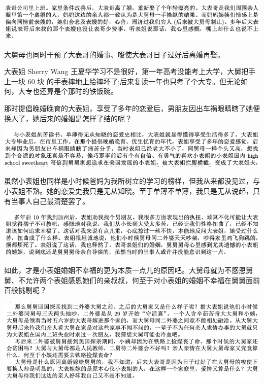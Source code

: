 \documentclass[9pt, b5paper]{article}
\begin{document}
\begin{center}
\includegraphics[width=.9\linewidth]{./pic/p1p92-2.png}
\end{center}

大舅母也同时干预了大表哥的婚事、唆使大表哥日子过好后离婚再娶。

大表姐 Sherry Wang 王夏华学习不是很好，第一年高考没能考上大学，大舅把手上一块 60 块 的手表摔地上给摔坏了;后来复读一年也只考了个大专。但无论如何，大专也还算是个那时的铁饭碗。

那时提倡晚婚晚育的大表姐，享受了多年的恋爱后，男朋友因出车祸眼睛瞎了她便换人了，她后来的婚姻是怎样了结的呢？

\begin{center}
\includegraphics[width=.9\linewidth]{./pic/p1p93.png}
\end{center}

虽然小表姐也同样是小时候爸妈为我所树立的学习的榜样，但我从来都没见过，与小表姐不熟。她的恋爱史我只是无从知晓。至于单薄不单薄，我只是无从说起，只有当事人自己最清楚罢了。

\begin{center}
\includegraphics[width=.9\linewidth]{./pic/p1p93-2.png}
\end{center}

如此，才是小表姐婚姻不幸福的更为本质一点儿的原因吧。大舅母就为不感恩舅舅、不允许两个表姐感恩她们的亲叔叔，何至于对小表姐的婚姻不幸福在舅舅面前百般挑剔呢？

\begin{center}
\includegraphics[width=.9\linewidth]{./pic/p1p122-2.png}
\end{center}
\end{document}
